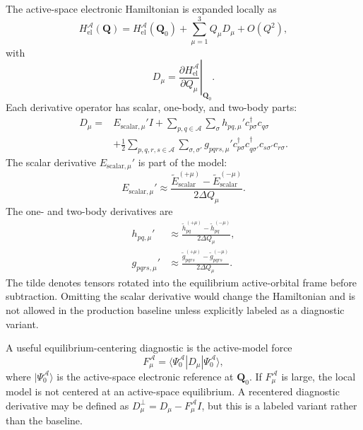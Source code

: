 \documentclass[
  reprint,
  amsmath,
  amssymb,
  aps,
  pra,
  nofootinbib,
  superscriptaddress,
  floatfix
]{revtex4-2}
\newcommand{\ket}[1]{|#1\rangle}
\newcommand{\bra}[1]{\langle #1|}
\newcommand{\Acal}{\mathcal{A}}
\newcommand{\el}{\mathrm{el}}
\newcommand{\scalar}{\mathrm{scalar}}
\begin{document}
The active-space electronic Hamiltonian is expanded locally as
\begin{equation}
H_{\el}^{\Acal}(\mathbf Q)
=
H_{\el}^{\Acal}(\mathbf Q_0)
+
\sum_{\mu=1}^{3}
Q_\mu D_\mu
+
O(Q^2),
\label{eq:linear_taylor}
\end{equation}
with
\begin{equation}
D_\mu
=
\left.
\frac{\partial H_{\el}^{\Acal}}{\partial Q_\mu}
\right|_{\mathbf Q_0}.
\label{eq:dmu_definition}
\end{equation}
Each derivative operator has scalar, one-body, and two-body parts:
\begin{align}
D_\mu
={}&
E_{\scalar,\mu}'I
+
\sum_{p,q\in\Acal}\sum_{\sigma}
h_{pq,\mu}'
c_{p\sigma}^{\dagger}c_{q\sigma}
\nonumber\\
&+
\frac12
\sum_{p,q,r,s\in\Acal}\sum_{\sigma,\sigma'}
g_{pqrs,\mu}'
c_{p\sigma}^{\dagger}c_{q\sigma'}^{\dagger}
c_{s\sigma'}c_{r\sigma}.
\label{eq:dmu_components}
\end{align}
The scalar derivative \(E_{\scalar,\mu}'\) is part of the model:
\begin{equation}
E_{\scalar,\mu}'
\approx
\frac{
\widetilde E_{\scalar}^{(+\mu)}
-
\widetilde E_{\scalar}^{(-\mu)}
}{
2\Delta Q_\mu
}.
\label{eq:scalar_derivative}
\end{equation}
The one- and two-body derivatives are
\begin{align}
h_{pq,\mu}'
&\approx
\frac{
\widetilde h_{pq}^{(+\mu)}
-
\widetilde h_{pq}^{(-\mu)}
}{
2\Delta Q_\mu
},
\nonumber\\
g_{pqrs,\mu}'
&\approx
\frac{
\widetilde g_{pqrs}^{(+\mu)}
-
\widetilde g_{pqrs}^{(-\mu)}
}{
2\Delta Q_\mu
}.
\label{eq:tensor_derivatives}
\end{align}
The tilde denotes tensors rotated into the equilibrium active-orbital frame before subtraction.  Omitting the scalar derivative would change the Hamiltonian and is not allowed in the production baseline unless explicitly labeled as a diagnostic variant.

A useful equilibrium-centering diagnostic is the active-model force
\begin{equation}
F_\mu^{\Acal}
=
\bra{\Psi_0^{\Acal}}D_\mu\ket{\Psi_0^{\Acal}},
\label{eq:active_force}
\end{equation}
where \(\ket{\Psi_0^{\Acal}}\) is the active-space electronic reference at \(\mathbf Q_0\).  If \(F_\mu^{\Acal}\) is large, the local model is not centered at an active-space equilibrium.  A recentered diagnostic derivative may be defined as \(D_\mu^\perp=D_\mu-F_\mu^{\Acal}I\), but this is a labeled variant rather than the baseline.
\end{document}
